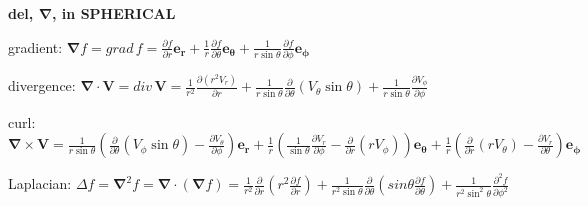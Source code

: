 \documentclass[letterpaper,landscape,10pt]{article}
\newenvironment{mydescription}
{\begin{description}
	\setlength{\itemsep}{0pt}
	\setlength{\parskip}{0pt}
	\setlength{\parsep}{-1pt}}
{\end{description}}
\begin{document}
{\begin{multicols}{4}
		\begin{center}\textbf{del, $\bm{\nabla}$, in SPHERICAL}\end{center}
		\begin{mydescription}
			\item[gradient:]
				$\bm{\nabla}f = grad\,f =
				\frac{\partial f}{\partial r}\bm{e_r} +
				\frac{1}{r}\frac{\partial f}{\partial \theta}\bm{e_\theta} +
				\frac{1}{r\sin\theta}\frac{\partial f}{\partial\phi}\bm{e_\phi}
				$
			\item[divergence:]
				$\bm{\nabla}\cdot\bm{V} = div\, \bm{V} =
				\frac{1}{r^2}\frac{\partial(r^2V_r)}{\partial r} +
				\frac{1}{r\sin\theta}\frac{\partial}{\partial\theta}\left({
				V_\theta\sin\theta}\right) +
				\frac{1}{r\sin\theta}\frac{\partial V_\phi}{\partial\phi}
				$
			\item[curl:]
				$\bm{\nabla}\times \bm{V} =
				\frac{1}{r\sin\theta}\left({ \frac{\partial}{\partial\theta}(V_\phi\sin\theta)-\frac{\partial V_\theta}{\partial\phi} }\right)\bm{e_r} +
				\frac{1}{r}\left({\frac{1}{\sin\theta}\frac{\partial V_r}{\partial\phi} - \frac{\partial}{\partial r}(r V_\phi) }\right) \bm{e_\theta} +
				\frac{1}{r}\left({\frac{\partial}{\partial r}(r V_\theta) -
				\frac{\partial V_r}{\partial\theta} }\right) \bm{e_\phi}
				$
			\item[Laplacian:]
				$\Delta f = \bm{\nabla}^2f =
				\bm{\nabla} \cdot (\bm{\nabla}f) =
				\frac{1}{r^2}\frac{\partial}{\partial r}\left( 
				r^2\frac{\partial f}{\partial r}\right) +
				\frac{1}{r^2\sin\theta}\frac{\partial}{\partial\theta}\left(
				sin\theta\frac{\partial f}{\partial\theta}\right) +
				\frac{1}{r^2\sin^2\theta}\frac{\partial^2f}{\partial\phi^2}
				$
		\end{mydescription}
		


\end{multicols}}
\end{document}

